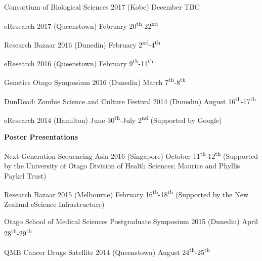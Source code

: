 \begin{small}
Consortium of Biological Sciences 2017 (Kobe) December TBC

eResearch 2017 (Queenstown) February 20\textsuperscript{th}-22\textsuperscript{nd}

Research Bazaar 2016 (Dunedin) February 2\textsuperscript{nd}-4\textsuperscript{th}

eResearch 2016 (Queenstown) February 9\textsuperscript{th}-11\textsuperscript{th}

Genetics Otago Symposium 2016 (Dunedin) March 7\textsuperscript{th}-8\textsuperscript{th} 

DunDead: Zombie Science and Culture Festival 2014 (Dunedin) %
August 16\textsuperscript{th}-17\textsuperscript{th}

eResearch 2014 (Hamilton) %
June 30\textsuperscript{th}-July 2\textsuperscript{nd}
(Supported by Google)

\end{small}

\textbf{Poster Presentations}

\begin{small}
Next Generation Sequencing Asia 2016 (Singapore) October 11\textsuperscript{th}-12\textsuperscript{th}
(Supported by the University of Otago Division of Health Sciences; Maurice and Phyllis Paykel Trust)

Research Bazaar 2015 (Melbourne) February 16\textsuperscript{th}-18\textsuperscript{th}
(Supported by the New Zealand eScience Infrastructure)

Otago School of Medical Sciences Postgraduate Symposium 2015 (Dunedin) April 28\textsuperscript{th}-29\textsuperscript{th}

QMB Cancer Drugs Satellite 2014 (Queenstown) August 24\textsuperscript{th}-25\textsuperscript{th}

\end{small}

